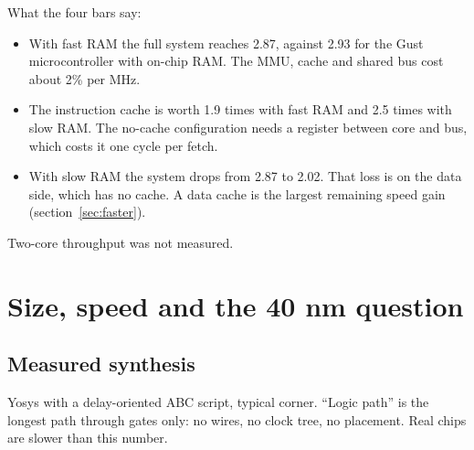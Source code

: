 \documentclass[10pt,a4paper]{article}
\begin{document}
\noindent What the four bars say:
\begin{itemize}
\item With fast RAM the full system reaches 2.87, against 2.93 for the Gust microcontroller with on-chip
RAM. The MMU, cache and shared bus cost about 2\% per MHz.
\item The instruction cache is worth 1.9 times with fast RAM and 2.5 times with slow RAM. The no-cache
configuration needs a register between core and bus, which costs it one cycle per fetch.
\item With slow RAM the system drops from 2.87 to 2.02. That loss is on the data side, which has no
cache. A data cache is the largest remaining speed gain (section~\ref{sec:faster}).
\end{itemize}
Two-core throughput was not measured.

\section{Size, speed and the 40 nm question}\label{sec:40nm}
\subsection{Measured synthesis}
Yosys with a delay-oriented ABC script, typical corner. ``Logic path'' is the longest path through gates
only: no wires, no clock tree, no placement. Real chips are slower than this number.
\end{document}
